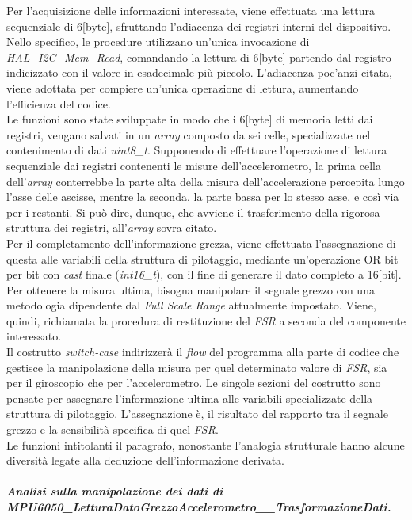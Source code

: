 \documentclass[11pt]{report}
\begin{document}
Per l'acquisizione delle informazioni interessate, viene effettuata una lettura sequenziale di 6[byte], sfruttando l'adiacenza dei registri interni del dispositivo.
Nello specifico, le procedure utilizzano un'unica invocazione di \textit{HAL\_I2C\_Mem\_Read}, comandando la lettura di 6[byte] partendo dal registro indicizzato con il valore in esadecimale più piccolo. L'adiacenza poc'anzi citata, viene adottata per compiere un'unica operazione di lettura, aumentando l'efficienza del codice.\\
Le funzioni sono state sviluppate in modo che i 6[byte] di memoria letti dai registri, vengano salvati in un \textit{array} composto da sei celle, specializzate nel contenimento di dati \textit{uint8\_t}.
Supponendo di effettuare l'operazione di lettura sequenziale dai registri contenenti le misure dell'accelerometro, la prima cella dell'\textit{array} conterrebbe la parte alta della misura dell'accelerazione percepita lungo l'asse delle ascisse, mentre la seconda, la parte bassa per lo stesso asse, e così via per i restanti.
Si può dire, dunque, che avviene il trasferimento della rigorosa struttura dei registri, all'\textit{array} sovra citato.\\
Per il completamento dell'informazione grezza, viene effettuata l'assegnazione di questa alle variabili della struttura di pilotaggio, mediante un'operazione OR bit per bit con \textit{cast} finale (\textit{int16\_t}), con il fine di generare il dato completo a 16[bit].\\
Per ottenere la misura ultima, bisogna manipolare il segnale grezzo con una metodologia dipendente dal \textit{Full Scale Range} attualmente impostato. Viene, quindi, richiamata la procedura di restituzione del \textit{FSR} a seconda del componente interessato.\\
Il costrutto \textit{switch-case} indirizzerà il \textit{flow} del programma alla parte di codice che gestisce la manipolazione della misura per quel determinato valore di \textit{FSR}, sia per il giroscopio che per l'accelerometro. Le singole sezioni del costrutto sono pensate per assegnare l'informazione ultima alle variabili specializzate della struttura di pilotaggio.
L'assegnazione è, il risultato del rapporto tra il segnale grezzo e la sensibilità specifica di quel \textit{FSR}.\\
Le funzioni intitolanti il paragrafo, nonostante l'analogia strutturale hanno alcune diversità legate alla deduzione dell'informazione derivata.
\subparagraph{Analisi sulla manipolazione dei dati di\\MPU6050\_LetturaDatoGrezzoAccelerometro\_\_TrasformazioneDati.}
\end{document}
